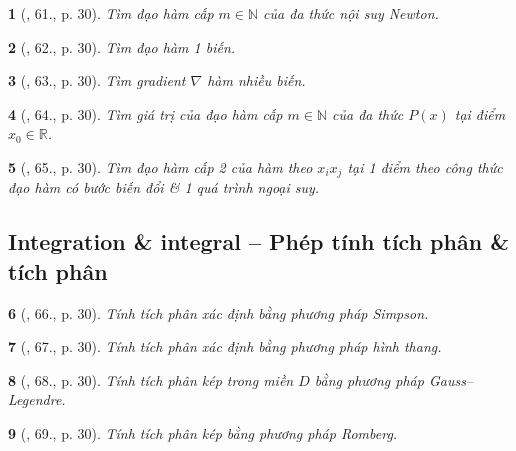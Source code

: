 \documentclass{article}
\newtheorem{baitoan}{}
\begin{document}
\begin{baitoan}[\cite{Doanh_Tuan_Pascal}, 61., p. 30]
	Tìm đạo hàm cấp $m\in\mathbb{N}$ của đa thức nội suy Newton.
\end{baitoan}

\begin{baitoan}[\cite{Doanh_Tuan_Pascal}, 62., p. 30]
	Tìm đạo hàm 1 biến.
\end{baitoan}

\begin{baitoan}[\cite{Doanh_Tuan_Pascal}, 63., p. 30]
	Tìm gradient $\nabla$ hàm nhiều biến.
\end{baitoan}

\begin{baitoan}[\cite{Doanh_Tuan_Pascal}, 64., p. 30]
	Tìm giá trị của đạo hàm cấp $m\in\mathbb{N}$ của đa thức $P(x)$ tại điểm $x_0\in\mathbb{R}$.
\end{baitoan}

\begin{baitoan}[\cite{Doanh_Tuan_Pascal}, 65., p. 30]
	Tìm đạo hàm cấp 2 của hàm theo $x_ix_j$ tại 1 điểm theo công thức đạo hàm có bước biến đổi \& 1 quá trình ngoại suy.
\end{baitoan}


\subsection{Integration \& integral -- Phép tính tích phân \& tích phân}

\begin{baitoan}[\cite{Doanh_Tuan_Pascal}, 66., p. 30]
	Tính tích phân xác định bằng phương pháp Simpson.
\end{baitoan}

\begin{baitoan}[\cite{Doanh_Tuan_Pascal}, 67., p. 30]
	Tính tích phân xác định bằng phương pháp hình thang.
\end{baitoan}

\begin{baitoan}[\cite{Doanh_Tuan_Pascal}, 68., p. 30]
	Tính tích phân kép trong miền $D$ bằng phương pháp Gauss--Legendre.
\end{baitoan}

\begin{baitoan}[\cite{Doanh_Tuan_Pascal}, 69., p. 30]
	Tính tích phân kép bằng phương pháp Romberg.
\end{baitoan}
\end{document}

